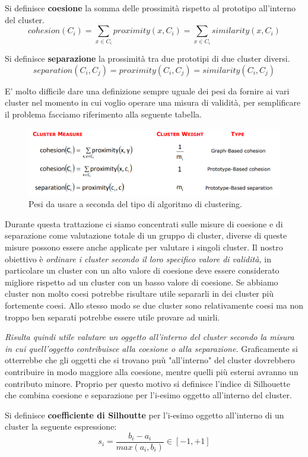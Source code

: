 \begin{defn}
	Si definisce \textbf{coesione} la somma delle prossimità rispetto al prototipo all'interno del  cluster.
	\[ cohesion(C_i) = \sum_{x \in C_i} proximity(x, C_i) = \sum_{x\in C_i} similarity(x, C_i)\]
\end{defn}
\begin{defn}
	Si definisce \textbf{separazione} la prossimità tra due prototipi di due cluster diversi.
	\[separation(C_{i}, C_{j}) = proximity(C_{i}, C_{j}) = similarity(C_{i}, C_{j})   \]
\end{defn}
E' molto difficile dare una definizione sempre uguale dei pesi da fornire ai vari cluster nel momento in cui voglio operare una misura di validità, per semplificare il problema facciamo riferimento alla seguente tabella.
\begin{figure}[H]
	\centering
	\includegraphics[height=0.250 \linewidth]{clustering/pict/pesi_validity.png}
	\caption{Pesi da usare a seconda del tipo di algoritmo di clustering.}
\end{figure}
Durante questa trattazione ci siamo concentrati sulle misure di coesione e di separazione come valutazione totale di un gruppo di cluster, diverse di queste misure possono essere anche applicate per valutare i singoli cluster. Il nostro obiettivo è \textit{ordinare i cluster secondo il loro specifico valore di validità,} in particolare un cluster con un alto valore di coesione deve essere considerato migliore rispetto ad un cluster con un basso valore di coesione.
Se abbiamo cluster non molto coesi potrebbe risultare utile separarli in dei cluster più fortemente coesi. Allo stesso modo se due cluster sono relativamente coesi ma non troppo ben separati potrebbe essere utile provare ad unirli.

\textit{Risulta quindi utile valutare un oggetto all'interno del cluster secondo la misura in cui quell'oggetto contribuisce alla coesione o alla separazione.} Graficamente si otterrebbe che gli oggetti che si trovano puù "all'interno" del cluster dovrebbero contribuire in modo maggiore alla coesione, mentre quelli più esterni avranno un contributo minore. Proprio per questo motivo si definisce l'indice di Silhouette che combina coesione e separazione per l'i-esimo oggetto all'interno del cluster.
\begin{defn}
	Si definisce \textbf{coefficiente di Silhoutte} per l'i-esimo oggetto all'interno di un cluster la seguente espressione:
	\[s_i = \frac{b_i - a_i}{max(a_i,b_i)} \in [-1,+1]\]
\end{defn}

